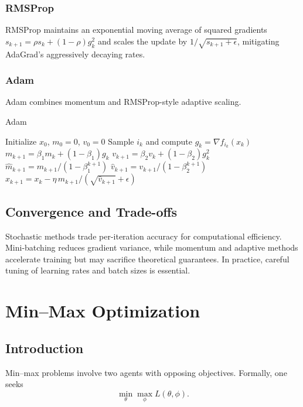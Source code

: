 \documentclass[11pt]{book}
\begin{document}
\subsubsection{RMSProp \cite{tieleman2012}}
RMSProp maintains an exponential moving average of squared gradients $s_{k+1}=\rho s_k+(1-\rho)g_k^2$ and scales the update by $1/\sqrt{s_{k+1}+\epsilon}$, mitigating AdaGrad's aggressively decaying rates.

\subsubsection{Adam \cite{kingma2015}}
Adam combines momentum and RMSProp-style adaptive scaling.

\begin{algorithm}
\caption{Adam}
\begin{algorithmic}[1]
\STATE Initialize $x_0$, $m_0=0$, $v_0=0$
    \STATE Sample $i_k$ and compute $g_k=\nabla f_{i_k}(x_k)$
    \STATE $m_{k+1}=\beta_1 m_k + (1-\beta_1)g_k$
    \STATE $v_{k+1}=\beta_2 v_k + (1-\beta_2)g_k^2$
    \STATE $\hat{m}_{k+1}=m_{k+1}/(1-\beta_1^{k+1})$
    \STATE $\hat{v}_{k+1}=v_{k+1}/(1-\beta_2^{k+1})$
    \STATE $x_{k+1}=x_k-\eta\,\hat{m}_{k+1}/(\sqrt{\hat{v}_{k+1}}+\epsilon)$
\ENDFOR
\end{algorithmic}
\end{algorithm}

\subsection{Convergence and Trade-offs}
Stochastic methods trade per-iteration accuracy for computational efficiency. Mini-batching reduces gradient variance, while momentum and adaptive methods accelerate training but may sacrifice theoretical guarantees. In practice, careful tuning of learning rates and batch sizes is essential.

\section{Min--Max Optimization}
\subsection{Introduction}
Min--max problems involve two agents with opposing objectives. Formally, one seeks
\begin{equation}
\min_{\theta} \max_{\phi} L(\theta,\phi).
\end{equation}
\end{document}
